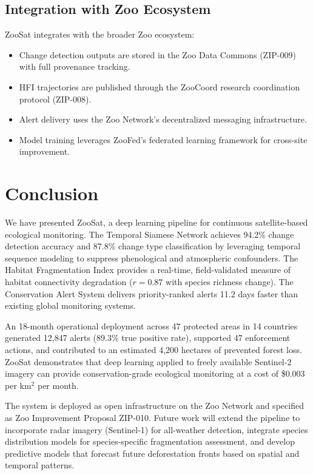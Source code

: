 \documentclass[11pt,a4paper]{article}
\begin{document}
\subsection{Integration with Zoo Ecosystem}

ZooSat integrates with the broader Zoo ecosystem:
\begin{itemize}[leftmargin=*]
    \item Change detection outputs are stored in the Zoo Data Commons (ZIP-009) with full provenance tracking.
    \item HFI trajectories are published through the ZooCoord research coordination protocol (ZIP-008).
    \item Alert delivery uses the Zoo Network's decentralized messaging infrastructure.
    \item Model training leverages ZooFed's federated learning framework for cross-site improvement.
\end{itemize}

\section{Conclusion}
\label{sec:conclusion}

We have presented ZooSat, a deep learning pipeline for continuous satellite-based ecological monitoring.
The Temporal Siamese Network achieves 94.2\% change detection accuracy and 87.8\% change type classification by leveraging temporal sequence modeling to suppress phenological and atmospheric confounders.
The Habitat Fragmentation Index provides a real-time, field-validated measure of habitat connectivity degradation ($r = 0.87$ with species richness change).
The Conservation Alert System delivers priority-ranked alerts 11.2 days faster than existing global monitoring systems.

An 18-month operational deployment across 47 protected areas in 14 countries generated 12,847 alerts (89.3\% true positive rate), supported 47 enforcement actions, and contributed to an estimated 4,200 hectares of prevented forest loss.
ZooSat demonstrates that deep learning applied to freely available Sentinel-2 imagery can provide conservation-grade ecological monitoring at a cost of \$0.003 per km$^2$ per month.

The system is deployed as open infrastructure on the Zoo Network and specified as Zoo Improvement Proposal ZIP-010.
Future work will extend the pipeline to incorporate radar imagery (Sentinel-1) for all-weather detection, integrate species distribution models for species-specific fragmentation assessment, and develop predictive models that forecast future deforestation fronts based on spatial and temporal patterns.
\end{document}
